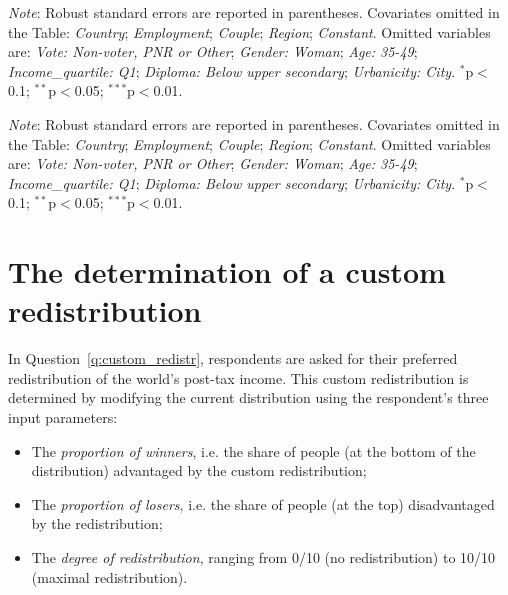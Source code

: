\begin{table}[h]
    \caption[Correlates of support for global redistribution]{Correlates of support for global redistribution (multivariate OLS regressions). %
    } \label{tab:determinant}
    \makebox[\textwidth][c]{
\resizebox*{!}{.73\textheight}{ %
        
        }
    }
    {\footnotesize \textit{Note}: Robust standard errors are reported in parentheses. Covariates omitted in the Table: \textit{Country}; \textit{Employment}; \textit{Couple}; \textit{Region}; \textit{Constant}. Omitted variables are: \textit{Vote: Non-voter, PNR or Other}; \textit{Gender: Woman}; \textit{Age: 35-49}; \textit{Income\_quartile: Q1}; \textit{Diploma: Below upper secondary}; \textit{Urbanicity: City}. \hfill $^{*}$p$<$0.1; $^{**}$p$<$0.05; $^{***}$p$<$0.01.
    }
\end{table}

\begin{table}[h]
    \caption[Correlates of answers on custom redistribution]{Correlates of answers on custom redistribution (multivariate OLS regressions). %
    } \label{tab:determinants_custom_redistr}
    \makebox[\textwidth][c]{
\resizebox*{!}{.73\textheight}{ %
        
        }
    }
    {\footnotesize \textit{Note}: Robust standard errors are reported in parentheses. Covariates omitted in the Table: \textit{Country}; \textit{Employment}; \textit{Couple}; \textit{Region}; \textit{Constant}. Omitted variables are: \textit{Vote: Non-voter, PNR or Other}; \textit{Gender: Woman}; \textit{Age: 35-49}; \textit{Income\_quartile: Q1}; \textit{Diploma: Below upper secondary}; \textit{Urbanicity: City}. \hfill $^{*}$p$<$0.1; $^{**}$p$<$0.05; $^{***}$p$<$0.01.
    }
\end{table}

\clearpage
\section{The determination of a custom redistribution}\label{app:algo}

In Question~\ref{q:custom_redistr}, respondents are asked for their preferred redistribution of the world's post-tax income. This custom redistribution is determined by modifying the current distribution using the respondent's three input parameters:
\begin{itemize}
    \item The \textit{proportion of winners}, i.e. the share of people (at the bottom of the distribution) advantaged by the custom redistribution;
    \item The \textit{proportion of losers}, i.e. the share of people (at the top) disadvantaged by the redistribution;
    \item The \textit{degree of redistribution}, ranging from 0/10 (no redistribution) to 10/10 (maximal redistribution).
\end{itemize}

